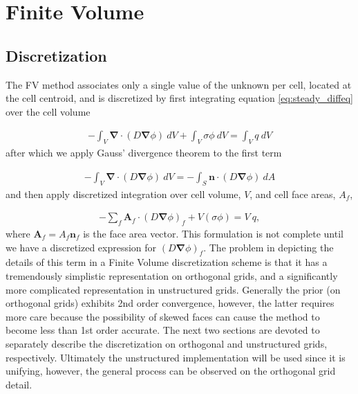 \documentclass[11pt,letterpaper,titlepage]{article}
\newcommand{\bnabla}{\boldsymbol{\nabla}}
\numberwithin{equation}{section}
\begin{document}
\newpage
{}
\section{Finite Volume}
\subsection{Discretization}
The FV method associates only a single value of the unknown per cell, located at the cell centroid, and is discretized by first integrating equation \eqref{eq:steady_diffeq} over the cell volume

\begin{equation}
\begin{aligned}
-\int_V \bnabla \cdot (D\bnabla\phi) \ dV + \int_V \sigma \phi \ dV = \int_V q \ dV
\end{aligned}
\end{equation}
\newline
after which we apply Gauss' divergence theorem to the first term

\begin{equation}
\begin{aligned}
-\int_V \bnabla \cdot (D\bnabla\phi) \ dV = 
-\int_S \mathbf{n} \cdot (D\bnabla\phi) \ dA
\end{aligned}
\end{equation}
\newline 
and then apply discretized integration over cell volume, $V$, and cell face areas, $A_f$,

\begin{equation}\label{eq:fv_needface}
\begin{aligned}
-\sum_f \mathbf{A}_f \cdot (D\bnabla\phi)_f  + V (\sigma \phi) = V \ q,
\end{aligned}
\end{equation}
\newline 
where $\mathbf{A}_f = A_f \mathbf{n}_f$ is the face area vector. This formulation is not complete until we have a discretized expression for $(D\bnabla \phi)_f$. The problem in depicting the details of this term in a Finite Volume discretization scheme is that it has a tremendously simplistic representation on orthogonal grids, and a significantly more complicated representation in unstructured grids. Generally the prior (on orthogonal grids) exhibits 2nd order convergence, however, the latter requires more care because the possibility of skewed faces can cause the method to become less than 1st order accurate.
\newline
\newline 
The next two sections are devoted to separately describe the discretization on orthogonal and unstructured grids, respectively. Ultimately the unstructured implementation will be used since it is unifying, however, the general process can be observed on the orthogonal grid detail.
\end{document}
